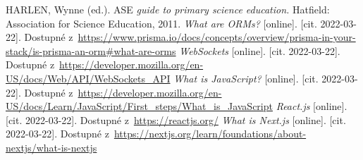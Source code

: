\begin{thebibliography}{99}
     HARLEN, Wynne (ed.). ASE \textit{guide to primary science education.} Hatfield: Association for Science Education, 2011.
     \textit{What are ORMs?} [online]. [cit. 2022-03-22]. Dostupné z~\url{https://www.prisma.io/docs/concepts/overview/prisma-in-your-stack/is-prisma-an-orm#what-are-orms}
     \textit{WebSockets} [online]. [cit. 2022-03-22]. Dostupné z~\url{https://developer.mozilla.org/en-US/docs/Web/API/WebSockets_API}
     \textit{What is JavaScript?} [online]. [cit. 2022-03-22]. Dostupné z~\url{https://developer.mozilla.org/en-US/docs/Learn/JavaScript/First_steps/What_is_JavaScript}
     \textit{React.js} [online]. [cit. 2022-03-22]. Dostupné z~\url{https://reactjs.org/}
     \textit{What is Next.js} [online]. [cit. 2022-03-22]. Dostupné z~\url{https://nextjs.org/learn/foundations/about-nextjs/what-is-nextjs}
    
\end{thebibliography}